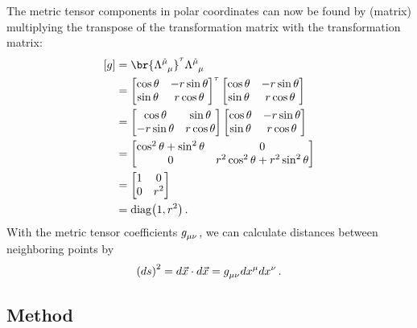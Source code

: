 The metric tensor components in polar coordinates can now be found by (matrix) multiplying the transpose of the transformation matrix with the transformation matrix:
%
\begin{align*}
  \asmatrix\metric &= \br{\ttransmat{\ridx\mu}{\mu}}^\tau\ttransmat{\ridx\mu}\mu \\
                   &= \begin{bmatrix}
                        \cos\cypos & -\cxpos\sin\cypos \\
                        \sin\cypos &  \cxpos\cos\cypos
                      \end{bmatrix}^{\tau}
                      \begin{bmatrix}
                        \cos\cypos & -\cxpos\sin\cypos \\
                        \sin\cypos &  \cxpos\cos\cypos
                      \end{bmatrix} \\
                   &= \begin{bmatrix}
                        \cos\cypos        & \sin\cypos \\
                        -\cxpos\sin\cypos & \cxpos\cos\cypos
                      \end{bmatrix}
                      \begin{bmatrix}
                        \cos\cypos & -\cxpos\sin\cypos \\
                        \sin\cypos &  \cxpos\cos\cypos
                      \end{bmatrix} \\
                   &= \begin{bmatrix}
                        \cos^2\cypos + \sin^2\cypos & 0 \\
                        0                           & \cxpos^2\cos^2\cypos + \cxpos^2\sin^2\cypos
                      \end{bmatrix} \\
                   &= \begin{bmatrix}
                        1 & 0 \\
                        0 & \cxpos^2
                      \end{bmatrix} \\
                   &= \diag\tuple{1,\cxpos^2}\,.
\end{align*}
%
With the metric tensor coefficients $\tmetric\mu\nu$, we can calculate distances between neighboring points by
%
\begin{equation*}
  \sqdifdist  = d\vec\pos\iprod d\vec\pos
              = \tmetric\mu\nu d\tvec\pos\mu d\tvec\pos\nu\,.
\end{equation*}


\subsection{Method}
%

